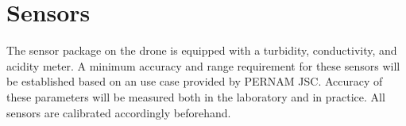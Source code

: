 \newpage
\section{Sensors}

The sensor package on the drone is equipped with a turbidity, conductivity, and acidity meter. A minimum accuracy and range requirement for these sensors will be established based on an use case provided by PERNAM JSC. Accuracy of these parameters will be measured both in the laboratory and in practice. All sensors are calibrated accordingly beforehand.



